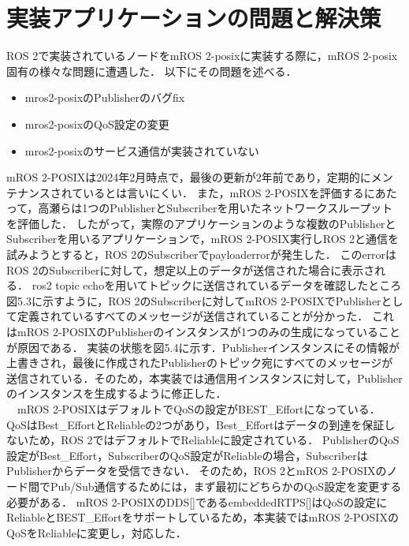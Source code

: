 \section{実装アプリケーションの問題と解決策}
ROS 2で実装されているノードをmROS 2-posixに実装する際に，mROS 2-posix固有の様々な問題に遭遇した．
以下にその問題を述べる．
\begin{itemize}
    \item mros2-posixのPublisherのバグfix
    \item mros2-posixのQoS設定の変更
    \item mros2-posixのサービス通信が実装されていない
\end{itemize}
mROS 2-POSIXは2024年2月時点で，最後の更新が2年前であり，定期的にメンテナンスされているとは言いにくい．
また，mROS 2-POSIXを評価するにあたって，高瀬らは1つのPublisherとSubscriberを用いたネットワークスループットを評価した．
したがって，実際のアプリケーションのような複数のPublisherとSubscriberを用いるアプリケーションで，mROS 2-POSIX実行しROS 2と通信を試みようとすると，ROS 2のSubscriberでpayloaderrorが発生した．
このerrorはROS 2のSubscriberに対して，想定以上のデータが送信された場合に表示される．
ros2 topic echoを用いてトピックに送信されているデータを確認したところ図5.3に示すように，ROS 2のSubscriberに対してmROS 2-POSIXでPublisherとして定義されているすべてのメッセージが送信されていることが分かった．
これはmROS 2-POSIXのPublisherのインスタンスが1つのみの生成になっていることが原因である．
実装の状態を図5.4に示す．Publisherインスタンスにその情報が上書きされ，最後に作成されたPublisherのトピック宛にすべてのメッセージが送信されている．そのため，本実装では通信用インスタンスに対して，Publisherのインスタンスを生成するように修正した．
\\　mROS 2-POSIXはデフォルトでQoSの設定がBEST\_Effortになっている．
QoSはBest\_EffortとReliableの2つがあり，Best\_Effortはデータの到達を保証しないため，ROS 2ではデフォルトでReliableに設定されている．
PublisherのQoS設定がBest\_Effort，SubscriberのQoS設定がReliableの場合，SubscriberはPublisherからデータを受信できない．
そのため，ROS 2とmROS 2-POSIXのノード間でPub/Sub通信するためには，まず最初にどちらかのQoS設定を変更する必要がある．
mROS 2-POSIXのDDS[]であるembeddedRTPS[]はQoSの設定にReliableとBEST\_Effortをサポートしているため，本実装ではmROS 2-POSIXのQoSをReliableに変更し，対応した．
